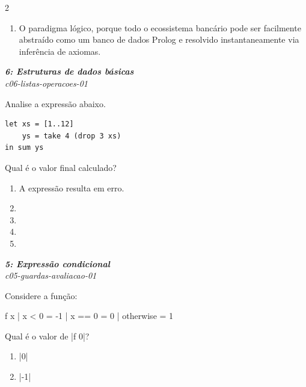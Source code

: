\documentclass[a4paper,10pt,brazil]{article}
\begin{document}
\begin{multicols}{2}
\begin{enumerate}
  \item O paradigma lógico, porque todo o ecossistema bancário pode ser facilmente abstraído como um banco de dados Prolog e resolvido instantaneamente via inferência de axiomas.


\end{enumerate}

\begin{flushright}
  \footnotesize
  \textit{\textbf{6: Estruturas de dados básicas}}\\
  \textit{c06-listas-operacoes-01}\\

\end{flushright}
Analise a expressão abaixo.
\begin{verbatim}
let xs = [1..12]
    ys = take 4 (drop 3 xs)
in sum ys
\end{verbatim}
Qual é o valor final calculado?

\begin{enumerate}
  \item A expressão resulta em erro.

  \item {}

  \item {}

  \item {}

  \item {}


\end{enumerate}

\begin{flushright}
  \footnotesize
  \textit{\textbf{5: Expressão condicional}}\\
  \textit{c05-guardas-avaliacao-01}\\

\end{flushright}
Considere a função:
\begin{haskellcode}
f x
  | x < 0 = -1
  | x == 0 = 0
  | otherwise = 1
\end{haskellcode}
Qual é o valor de \haskellinline|f 0|?

\begin{enumerate}
  \item \haskellinline|0|

  \item \haskellinline|-1|


\end{enumerate}
\end{multicols}
\end{document}
